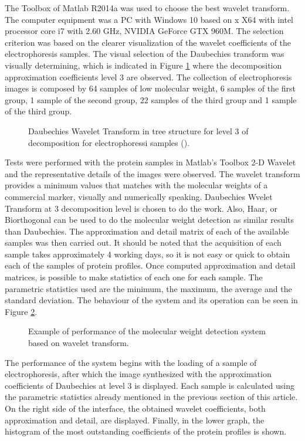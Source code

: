 \documentclass[a4paper]{llncs}
\begin{document}
The Toolbox of Matlab R2014a was used to choose the best wavelet transform. The computer equipment was a PC with Windows 10 based on x
X64 with intel processor core i7 with 2.60 GHz, NVIDIA GeForce GTX 960M. The selection criterion was based on the clearer visualization of the wavelet coefficients of the electrophoresis samples. The visual selection of the Daubechies transform was visually determining, which is indicated in Figure \ref{tool} where the decomposition approximation coefficients level 3 are observed. The collection of electrophoresis images is composed by 64 samples of low molecular weight, 6 samples of the first group, 1 sample of the second group, 22 samples of the third group and 1 sample of the third group.

\begin{figure}[h!]
\centering{
}
\caption{Daubechies Wavelet Transform in tree structure for level 3 of decomposition for electrophoressi samples (\cite{Misti}).} \label{tool}
\end{figure}


Tests were performed with the protein samples in Matlab's Toolbox 2-D Wavelet and the representative details of the images were observed. The wavelet transform provides a minimum values that matches with the molecular weights of a commercial marker, visually and numerically speaking. Daubechies Wvelet Transform at 3 decomposition level is chosen to do the work. Also, Haar, or Biorthogonal can be used to do the molecular weight detection as similar results than Daubechies. The approximation and detail matrix of each of the available samples was then carried out. It should be noted that the acquisition of each sample takes approximately 4 working days, so it is not easy or quick to obtain each of the samples of protein profiles. Once computed approximation and detail matrices, is possible to make statistics of each one for each sample. The parametric statistics used are the minimum, the maximum, the average and the standard deviation. The behaviour of the system and its operation can be seen in Figure \ref{pantalla1}.

\begin{figure}[h!]
\centering{
}
\caption{Example of performance of the molecular weight detection system based on wavelet transform.} \label{pantalla1}
\end{figure}


The performance of the system begins with the loading of a sample of electrophoresis, after which the image synthesized with the approximation coefficients of Daubechies at level 3 is displayed. Each sample is calculated using the parametric statistics already mentioned in the previous section of this article. On the right side of the interface, the obtained wavelet coefficients, both approximation and detail, are displayed. Finally, in the lower graph, the histogram of the most outstanding coefficients of the protein profiles is shown.
\end{document}
